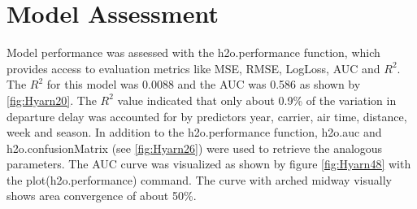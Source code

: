 \documentclass[12pt,twoside]{amherstthesis}
\begin{document}
  \begin{Shaded}
  \begin{Highlighting}[]
  \StringTok{ }\NormalTok{(}\NormalTok{(}\NormalTok{, }
                                      \NormalTok{, }\NormalTok{, }
                                      \NormalTok{, }\NormalTok{))}
   
  \StringTok{ }\NormalTok{(} \NormalTok{, } 
                      \NormalTok{,}
           \NormalTok{, } \NormalTok{, } \NormalTok{)}
  \end{Highlighting}
  \end{Shaded}
  
  \section{Model Assessment}\label{model-assessment}
  
  Model performance was assessed with the h2o.performance function, which
  provides access to evaluation metrics like MSE, RMSE, LogLoss, AUC and
  \(R^{2}\). The \(R^{2}\) for this model was 0.0088 and the AUC was 0.586
  as shown by \autoref{fig:Hyarn20}. The \(R^{2}\) value indicated that
  only about 0.9\% of the variation in departure delay was accounted for
  by predictors year, carrier, air time, distance, week and season. In
  addition to the h2o.performance function, h2o.auc and
  h2o.confusionMatrix (see \autoref{fig:Hyarn26}) were used to retrieve
  the analogous parameters. The AUC curve was visualized as shown by
  figure \autoref{fig:Hyarn48} with the plot(h2o.performance) command. The
  curve with arched midway visually shows area convergence of about 50\%.
  
  \begin{Shaded}
  \begin{Highlighting}[]
  \StringTok{ }\NormalTok{(mat$No[}\NormalTok{]+mat$Yes[}\NormalTok{])/(mat$No[}\NormalTok{]+}
  \StringTok{                                      }\NormalTok{mat$No[}\NormalTok{]+mat$Yes[}\NormalTok{]+}
  \StringTok{                                      }\NormalTok{mat$Yes[}\NormalTok{]) }
  \NormalTok{(}
  \end{Highlighting}
  \end{Shaded}
  
\end{document}
